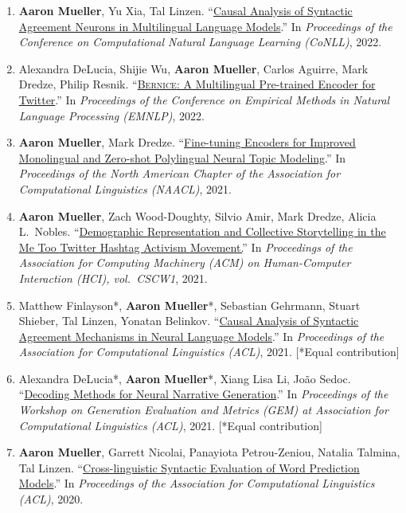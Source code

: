 \documentclass[10pt]{article}
\providecommand*\titlelink[2]{\href{#1}{\textcolor{accent}{#2}}}
\begin{document}
\begin{enumerate}[leftmargin=*, topsep=0pt, itemsep=0.25ex, partopsep=0ex, parsep=1ex]
	\item \textbf{Aaron Mueller}, Yu Xia, Tal Linzen. ``\titlelink{https://arxiv.org/abs/2210.14328}{Causal Analysis of Syntactic Agreement Neurons in Multilingual Language Models}.'' In \emph{Proceedings of the Conference on Computational Natural Language Learning (CoNLL)}, 2022.\label{pub:causal-multiling}
	
	\item Alexandra DeLucia, Shijie Wu, \textbf{Aaron Mueller}, Carlos Aguirre, Mark Dredze, Philip Resnik. ``\titlelink{https://preview.aclanthology.org/emnlp-22-ingestion/2022.emnlp-main.415/}{\textsc{Bernice}: A Multilingual Pre-trained Encoder for Twitter}.'' In \emph{Proceedings of the Conference on Empirical Methods in Natural Language Processing (EMNLP)}, 2022.
			
	\item \textbf{Aaron Mueller}, Mark Dredze. ``\titlelink{https://aclanthology.org/2021.naacl-main.243/}{Fine-tuning Encoders for Improved Monolingual and Zero-shot Polylingual Neural Topic Modeling}.'' In \emph{Proceedings of the North American Chapter of the Association for Computational Linguistics (NAACL)}, 2021.  
	
	\item \textbf{Aaron Mueller}, Zach Wood-Doughty, Silvio Amir, Mark Dredze, Alicia L.\ Nobles. ``\titlelink{https://dl.acm.org/doi/10.1145/3449181}{Demographic Representation and Collective Storytelling in the Me Too Twitter Hashtag Activism Movement.}'' In \emph{Proceedings of the Association for Computing Machinery (ACM) on Human-Computer Interaction (HCI), vol.\ CSCW1}, 2021.

	\item Matthew Finlayson*, \textbf{Aaron Mueller}*, Sebastian Gehrmann, Stuart Shieber, Tal Linzen, Yonatan Belinkov. ``\titlelink{https://aclanthology.org/2021.acl-long.144/}{Causal Analysis of Syntactic Agreement Mechanisms in Neural Language Models}.'' In \emph{Proceedings of the Association for Computational Linguistics (ACL)}, 2021. [*Equal contribution]\label{pub:causal}
	
	\item Alexandra DeLucia*, \textbf{Aaron Mueller}*, Xiang Lisa Li, João Sedoc. ``\titlelink{https://aclanthology.org/2021.gem-1.16/}{Decoding Methods for Neural Narrative Generation}.'' In \emph{Proceedings of the Workshop on Generation Evaluation and Metrics (GEM) at Association for Computational Linguistics (ACL)}, 2021. [*Equal contribution]

	\item \textbf{Aaron Mueller}, Garrett Nicolai, Panayiota Petrou-Zeniou, Natalia Talmina, Tal Linzen. ``\titlelink{https://aclanthology.org/2020.acl-main.490/}{Cross-linguistic Syntactic Evaluation of Word Prediction Models}.'' In \emph{Proceedings of the Association for Computational Linguistics (ACL)}, 2020.


\end{enumerate}
\end{document}
